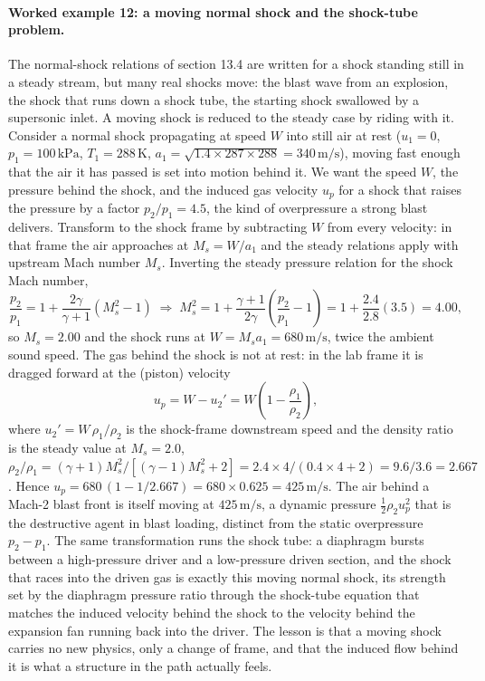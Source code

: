 \paragraph{Worked example 12: a moving normal shock and the shock-tube
problem.} The normal-shock relations of section 13.4 are written for a
shock standing still in a steady stream, but many real shocks move: the
blast wave from an explosion, the shock that runs down a shock tube, the
starting shock swallowed by a supersonic inlet. A moving shock is
reduced to the steady case by riding with it. Consider a normal shock
propagating at speed $W$ into still air at rest ($u_1 = 0$,
$p_1 = 100\,\text{kPa}$, $T_1 = 288\,\si{\kelvin}$,
$a_1 = \sqrt{1.4\times 287\times 288} = 340\,\si{\meter\per\second}$),
moving fast enough that the air it has passed is set into motion behind
it. We want the speed $W$, the pressure behind the shock, and the
induced gas velocity $u_p$ for a shock that raises the pressure by a
factor $p_2/p_1 = 4.5$, the kind of overpressure a strong blast
delivers. Transform to the shock frame by subtracting $W$ from every
velocity: in that frame the air approaches at $M_s = W/a_1$ and the
steady relations apply with upstream Mach number $M_s$. Inverting the
steady pressure relation for the shock Mach number,
\[
\frac{p_2}{p_1} = 1 + \frac{2\gamma}{\gamma + 1}(M_s^2 - 1)
\;\Longrightarrow\;
M_s^2 = 1 + \frac{\gamma + 1}{2\gamma}\!\left(\frac{p_2}{p_1} - 1\right)
= 1 + \frac{2.4}{2.8}(3.5) = 4.00,
\]
so $M_s = 2.00$ and the shock runs at $W = M_s a_1 = 680\,\si{\meter
\per\second}$, twice the ambient sound speed. The gas behind the shock
is not at rest: in the lab frame it is dragged forward at the
 (piston) velocity
\[
u_p = W - u_2' = W\!\left(1 - \frac{\rho_1}{\rho_2}\right),
\]
where $u_2' = W\,\rho_1/\rho_2$ is the shock-frame downstream speed and
the density ratio is the steady value at $M_s = 2.0$,
$\rho_2/\rho_1 = (\gamma + 1)M_s^2/[(\gamma - 1)M_s^2 + 2] =
2.4\times 4/(0.4\times 4 + 2) = 9.6/3.6 = 2.667$. Hence
$u_p = 680\,(1 - 1/2.667) = 680\times 0.625 = 425\,\si{\meter\per
\second}$. The air behind a Mach-2 blast front is itself moving at
$425\,\si{\meter\per\second}$, a dynamic pressure
$\tfrac{1}{2}\rho_2 u_p^2$ that is the destructive agent in blast
loading, distinct from the static overpressure $p_2 - p_1$. The same
transformation runs the shock tube: a diaphragm bursts between a
high-pressure driver and a low-pressure driven section, and the shock
that races into the driven gas is exactly this moving normal shock, its
strength set by the diaphragm pressure ratio through the shock-tube
equation that matches the induced velocity behind the shock to the
velocity behind the expansion fan running back into the driver. The
lesson is that a moving shock carries no new physics, only a change of
frame, and that the induced flow behind it is what a structure in the
path actually feels.

